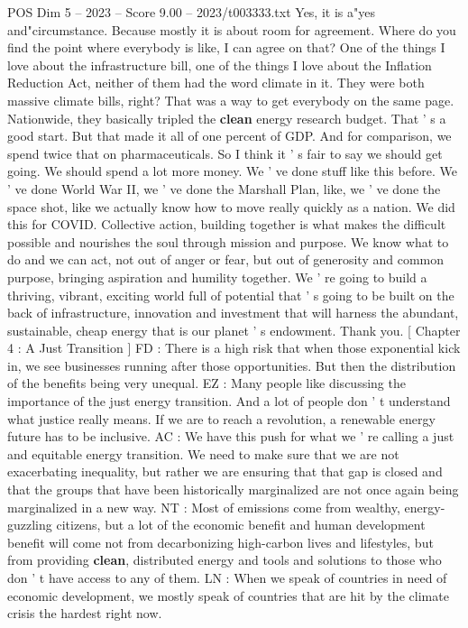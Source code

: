 \begin{textsample}{POS Dim 5 – 2023 – Score 9.00 – 2023/t003333.txt}
Yes, it is a"yes and"circumstance.
Because mostly it is about room for agreement.
Where do you find the point where everybody is like, I can agree on that?
One of the things I love about the infrastructure bill, one of the things I love about the Inflation Reduction Act, neither of them had the word climate in it.
They were both massive climate bills, right?
That was a way to get everybody on the same page.
Nationwide, they basically tripled the \textbf{clean} energy research budget.
That ' s a good start.
But that made it all of one percent of GDP.
And for comparison, we spend twice that on pharmaceuticals.
So I think it ' s fair to say we should get going.
We should spend a lot more money.
We ' ve done stuff like this before.
We ' ve done World War II, we ' ve done the Marshall Plan, like, we ' ve done the space shot, like we actually know how to move really quickly as a nation.
We did this for COVID.
Collective action, building together is what makes the difficult possible and nourishes the soul through mission and purpose.
We know what to do and we can act, not out of anger or fear, but out of generosity and common purpose, bringing aspiration and humility together.
We ' re going to build a thriving, vibrant, exciting world full of potential that ' s going to be built on the back of infrastructure, innovation and investment that will harness the abundant, sustainable, cheap energy that is our planet ' s endowment.
Thank you. [ Chapter 4 : A Just Transition ] FD : There is a high risk that when those exponential kick in, we see businesses running after those opportunities.
But then the distribution of the benefits being very unequal.
EZ : Many people like discussing the importance of the just energy transition.
And a lot of people don ' t understand what justice really means.
If we are to reach a revolution, a renewable energy future has to be inclusive.
AC : We have this push for what we ' re calling a just and equitable energy transition.
We need to make sure that we are not exacerbating inequality, but rather we are ensuring that that gap is closed and that the groups that have been historically marginalized are not once again being marginalized in a new way.
NT : Most of emissions come from wealthy, energy-guzzling citizens, but a lot of the economic benefit and human development benefit will come not from decarbonizing high-carbon lives and lifestyles, but from providing \textbf{clean}, distributed energy and tools and solutions to those who don ' t have access to any of them.
LN : When we speak of countries in need of economic development, we mostly speak of countries that are hit by the climate crisis the hardest right now.

\end{textsample}
